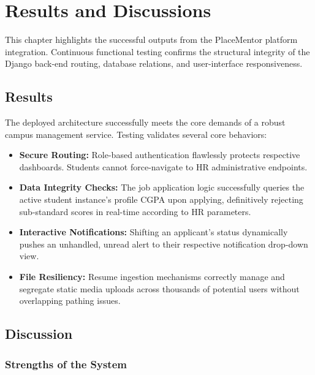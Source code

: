 \documentclass[a4paper,12pt]{report}
\begin{document}
\chapter{Results and Discussions}

This chapter highlights the successful outputs from the PlaceMentor platform integration. Continuous functional testing confirms the structural integrity of the Django back-end routing, database relations, and user-interface responsiveness.

\section{Results}

The deployed architecture successfully meets the core demands of a robust campus management service. Testing validates several core behaviors:

\begin{itemize}
    \item \textbf{Secure Routing:} Role-based authentication flawlessly protects respective dashboards. Students cannot force-navigate to HR administrative endpoints.
    \item \textbf{Data Integrity Checks:} The job application logic successfully queries the active student instance's profile CGPA upon applying, definitively rejecting sub-standard scores in real-time according to HR parameters.
    \item \textbf{Interactive Notifications:} Shifting an applicant's status dynamically pushes an unhandled, unread alert to their respective notification drop-down view.
    \item \textbf{File Resiliency:} Resume ingestion mechanisms correctly manage and segregate static media uploads across thousands of potential users without overlapping pathing issues.
\end{itemize}

\section{Discussion}

\subsection{Strengths of the System}
\end{document}
